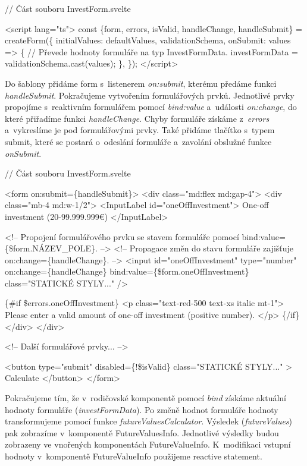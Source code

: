 \begin{prog}
// Část souboru InvestForm.svelte

<script lang="ts">
  const \{form, errors, isValid, handleChange, handleSubmit\} = createForm(\{
    initialValues: defaultValues,
    validationSchema,
    onSubmit: values => \{
      // Převede hodnoty formuláře na typ InvestFormData.
      investFormData = validationSchema.cast(values);
    \},
  \});
</script>
\end{prog}

Do šablony přidáme form s~listenerem \emph{on:submit}, kterému předáme funkci \emph{handleSubmit}. Pokračujeme vytvořením formulářových prvků. 
Jednotlivé prvky propojíme s~reaktivním formulářem pomocí \emph{bind:value} a~události \emph{on:change}, do které přiřadíme funkci \emph{handleChange}. 
Chyby formuláře získáme z~\emph{errors} a~vykreslíme je pod formulářovými prvky. 
Také přidáme tlačítko s~typem submit, které se postará o~odeslání formuláře a~zavolání obslužné funkce \emph{onSubmit}.

\begin{prog}
// Část souboru InvestForm.svelte

<form on:submit=\{handleSubmit\}>
  <div class="md:flex md:gap-4">
    <div class="mb-4 md:w-1/2">
      <InputLabel id="oneOffInvestment">
        One-off investment (20-99.999.999€)
      </InputLabel>

      <!-- Propojení formulářového prvku se stavem formuláře
        pomocí bind:value=\{\$form.NÁZEV_POLE\}. -->
      <!-- Propagace změn do stavu formuláře 
        zajišťuje on:change=\{handleChange\}. -->
      <input
        id="oneOffInvestment"
        type="number"
        on:change=\{handleChange\}
        bind:value=\{\$form.oneOffInvestment\}
        class="STATICKÉ STYLY..."
      />

      \{#if \$errors.oneOffInvestment\}
        <p class="text-red-500 text-xs italic mt-1">
          Please enter a valid amount of one-off investment (positive number).
        </p>
      \{/if\}
    </div>
  </div>

  <!-- Další formulářové prvky... -->

  <button
    type="submit"
    disabled=\{!\$isValid\}
    class="STATICKÉ STYLY..."
  >
    Calculate
  </button>
</form>
\end{prog}

Pokračujeme tím, že v~rodičovské komponentě pomocí \emph{bind} získáme aktuální hodnoty formuláře (\emph{investFormData}). Po změně hodnot formuláře hodnoty transformujeme pomocí funkce \emph{futureValuesCalculator}. 
Výsledek (\emph{futureValues}) pak zobrazíme v~komponentě FutureValuesInfo. Jednotlivé výsledky budou zobrazeny ve vnořených komponentách FutureValueInfo. 
K~modifikaci vstupní hodnoty v~komponentě FutureValueInfo použijeme reactive statement.

